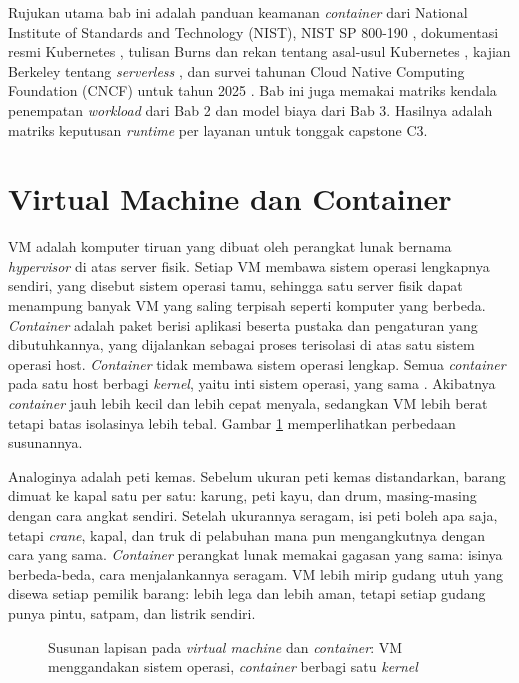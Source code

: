 Rujukan utama bab ini adalah panduan keamanan \textit{container} dari National Institute of
Standards and Technology (NIST), NIST SP 800-190 \cite{c08-nist800-190}, dokumentasi resmi
Kubernetes \cite{c08-k8s-overview}, tulisan Burns dan rekan tentang asal-usul Kubernetes
\cite{c08-burns2016}, kajian Berkeley tentang \textit{serverless} \cite{c08-jonas2019}, dan survei
tahunan Cloud Native Computing Foundation (CNCF) untuk tahun 2025 \cite{cncf-survey2025}. Bab ini
juga memakai matriks kendala penempatan \textit{workload} dari Bab 2 dan model biaya dari Bab 3.
Hasilnya adalah matriks keputusan \textit{runtime} per layanan untuk tonggak capstone C3.

\section{Virtual Machine dan Container}
\label{sec:ch08-vm-container}

VM adalah komputer tiruan yang dibuat oleh perangkat lunak bernama \textit{hypervisor} di atas
server fisik. Setiap VM membawa sistem operasi lengkapnya sendiri, yang disebut sistem operasi
tamu, sehingga satu server fisik dapat menampung banyak VM yang saling terpisah seperti komputer
yang berbeda. \textit{Container} adalah paket berisi aplikasi beserta pustaka dan pengaturan yang
dibutuhkannya, yang dijalankan sebagai proses terisolasi di atas satu sistem operasi host.
\textit{Container} tidak membawa sistem operasi lengkap. Semua \textit{container} pada satu host
berbagi \textit{kernel}, yaitu inti sistem operasi, yang sama \cite{c08-nist800-190}. Akibatnya
\textit{container} jauh lebih kecil dan lebih cepat menyala, sedangkan VM lebih berat tetapi batas
isolasinya lebih tebal. Gambar \ref{fig:ch08-vm-container} memperlihatkan perbedaan susunannya.

Analoginya adalah peti kemas. Sebelum ukuran peti kemas distandarkan, barang dimuat ke kapal satu
per satu: karung, peti kayu, dan drum, masing-masing dengan cara angkat sendiri. Setelah ukurannya
seragam, isi peti boleh apa saja, tetapi \textit{crane}, kapal, dan truk di pelabuhan mana pun
mengangkutnya dengan cara yang sama. \textit{Container} perangkat lunak memakai gagasan yang sama:
isinya berbeda-beda, cara menjalankannya seragam. VM lebih mirip gudang utuh yang disewa setiap
pemilik barang: lebih lega dan lebih aman, tetapi setiap gudang punya pintu, satpam, dan listrik
sendiri.

\begin{figure}[!htb]
  \centering
  
  \caption{Susunan lapisan pada \textit{virtual machine} dan \textit{container}: VM menggandakan
           sistem operasi, \textit{container} berbagi satu \textit{kernel}}
  \label{fig:ch08-vm-container}
\end{figure}

